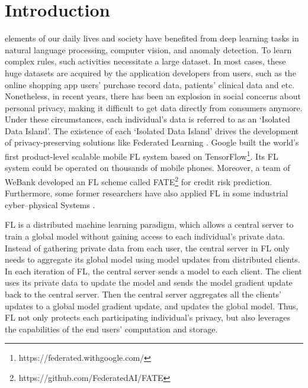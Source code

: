 \documentclass[journal]{IEEEtran}
\begin{document}
\section{Introduction}
 elements of our daily lives and society have benefited from deep learning tasks in natural language processing, computer vision, and anomaly detection. To learn complex rules, such activities necessitate a large dataset. In most cases, these huge datasets are acquired by the application developers from users, such as the online shopping app users' purchase record data, patients' clinical data and etc. Nonetheless, in recent years, there has been an explosion in social concerns about personal privacy, making it difficult to get data directly from consumers anymore. Under these circumstances, each individual's data is referred to as an `Isolated Data Island'. The existence of each `Isolated Data Island' drives the development of privacy-preserving solutions like Federated Learning \cite{ref_01_GoogleFL,ref_02_FLConcept,li2021a}. Google built the world's first product-level scalable mobile FL system based on TensorFlow\footnote{https://federated.withgoogle.com/}. Its FL system could be operated on thousands of mobile phones. Moreover, a team of WeBank developed an FL scheme called FATE\footnote{https://github.com/FederatedAI/FATE} for credit risk prediction. Furthermore, some former researchers have also applied FL in some industrial cyber–physical Systems \cite{ref_42_FLApp, ref_43_FLApp, hao2020hao}.

\par FL is a distributed machine learning paradigm, which allows a central server to train a global model without gaining access to each individual's private data. Instead of gathering private data from each user, the central server in FL only needs to aggregate its global model using model updates from distributed clients. In each iteration of FL, the central server sends a model to each client. The client uses its private data to update the model and sends the model gradient update back to the central server. Then the central server aggregates all the clients' updates to a global model gradient update, and updates the global model. Thus, FL not only protects each participating individual's privacy, but also leverages the capabilities of the end users' computation and storage.
\end{document}
